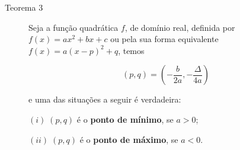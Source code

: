 \begin{description}
\item[Teorema 3]

Seja a função quadrática \(f\), de domínio real, definida por  \(f(x)=ax^2+bx+c\) ou pela sua forma equivalente \(f(x)=a(x-p)^2+q\), temos 

$$(p,q)= \left( -\frac{b}{2a}, -\frac{\Delta}{4a} \right)$$

e uma das situações a seguir é verdadeira:

\((i)\;(p,q)\) é o \textbf{ponto de mínimo}, se \(a>0\);

\((ii)\;(p,q)\) é o \textbf{ponto de máximo}, se \(a<0\).
\end{description}


\label{\detokenize{AF209-4::doc}}\label{\detokenize{AF209-4:para-saber-mais}}

